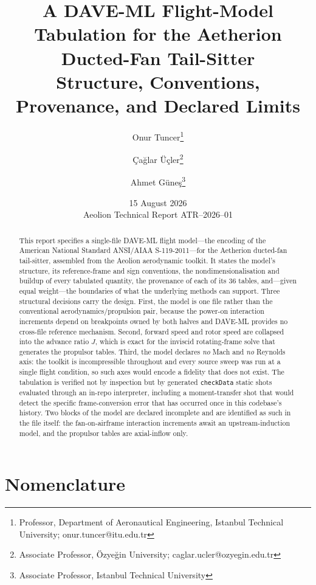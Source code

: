 \documentclass[11pt,a4paper]{article}
\title{\textbf{A DAVE-ML Flight-Model Tabulation for the Aetherion
Ducted-Fan Tail-Sitter}\\[2mm]
\large Structure, Conventions, Provenance, and Declared Limits}
\author{
  Onur Tuncer\thanks{Professor, Department of Aeronautical Engineering,
    Istanbul Technical University; onur.tuncer@itu.edu.tr}
  \and
  \c{C}a\u{g}lar \"U\c{c}ler\thanks{Associate Professor,
    \"Ozye\u{g}in University; caglar.ucler@ozyegin.edu.tr}
  \and
  Ahmet G\"une\c{s}\thanks{Associate Professor, Istanbul Technical
    University}
}
\date{15 August 2026 \\[1mm] \small Aeolion Technical Report ATR--2026--01}
\begin{document}
\maketitle

\begin{abstract}
\noindent
This report specifies a single-file DAVE-ML flight model---the encoding
of the American National Standard ANSI/AIAA S-119-2011---for the
Aetherion ducted-fan tail-sitter, assembled from the Aeolion aerodynamic
toolkit. It states the model's structure, its reference-frame
and sign conventions, the nondimensionalisation and buildup of every
tabulated quantity, the provenance of each of its 36 tables, and---given
equal weight---the boundaries of what the underlying methods can support.
Three structural decisions carry the design. First, the model is one file
rather than the conventional aerodynamics/propulsion pair, because the
power-on interaction increments depend on breakpoints owned by both
halves and DAVE-ML provides no cross-file reference mechanism. Second,
forward speed and rotor speed are collapsed into the advance ratio $J$,
which is exact for the inviscid rotating-frame solve that generates the
propulsor tables. Third, the model declares \emph{no} Mach and \emph{no}
Reynolds axis: the toolkit is incompressible throughout and every source
sweep was run at a single flight condition, so such axes would encode a
fidelity that does not exist. The tabulation is verified not by
inspection but by generated \texttt{checkData} static shots evaluated
through an in-repo interpreter, including a moment-transfer shot that
would detect the specific frame-conversion error that has occurred once
in this codebase's history. Two blocks of the model are declared
incomplete and are identified as such in the file itself: the
fan-on-airframe interaction increments await an upstream-induction model,
and the propulsor tables are axial-inflow only.
\end{abstract}

\tableofcontents
\newpage

\section*{Nomenclature}
\end{document}
